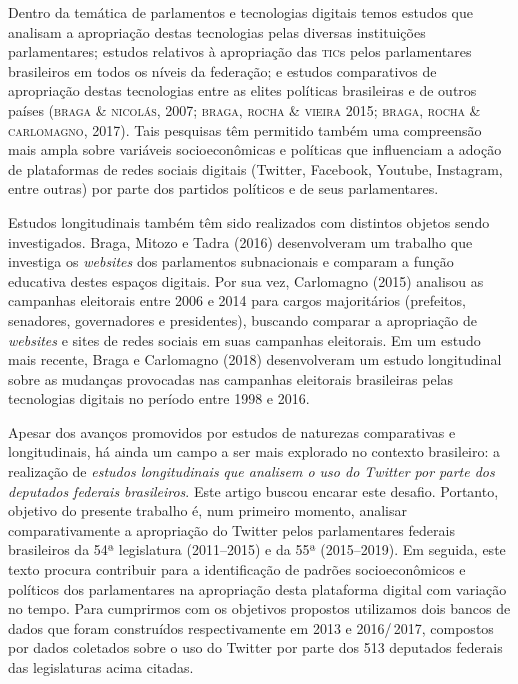 Dentro da temática de parlamentos e tecnologias digitais temos estudos
que analisam a apropriação destas tecnologias pelas diversas
instituições parlamentares; estudos relativos à apropriação das \textsc{tic}s
pelos parlamentares brasileiros em todos os níveis da federação; e
estudos comparativos de apropriação destas tecnologias entre as elites
políticas brasileiras e de outros países (\textsc{braga \& nicolás}, 2007; \textsc{braga,
rocha \& vieira} 2015; \textsc{braga, rocha \& carlomagno}, 2017). Tais pesquisas
têm permitido também uma compreensão mais ampla sobre variáveis
socioeconômicas e políticas que influenciam a adoção de plataformas de
redes sociais digitais (Twitter, Facebook, Youtube, Instagram, entre
outras) por parte dos partidos políticos e de seus parlamentares.

Estudos longitudinais também têm sido realizados com distintos objetos
sendo investigados. Braga, Mitozo e Tadra (2016) desenvolveram um
trabalho que investiga os \textit{websites} dos parlamentos subnacionais e
comparam a função educativa destes espaços digitais. Por sua vez,
Carlomagno (2015) analisou as campanhas eleitorais entre 2006 e 2014
para cargos majoritários (prefeitos, senadores, governadores e
presidentes), buscando comparar a apropriação de \textit{websites} e sites de
redes sociais em suas campanhas eleitorais. Em um estudo mais recente,
Braga e Carlomagno (2018) desenvolveram um estudo longitudinal sobre as
mudanças provocadas nas campanhas eleitorais brasileiras pelas
tecnologias digitais no período entre 1998 e 2016.

Apesar dos avanços promovidos por estudos de naturezas comparativas e
longitudinais, há ainda um campo a ser mais explorado no contexto
brasileiro: a realização de \textit{estudos longitudinais} \textit{que
analisem o uso do Twitter por parte dos deputados federais brasileiros}.
Este artigo buscou encarar este desafio. Portanto, objetivo do presente
trabalho é, num primeiro momento, analisar comparativamente a
apropriação do Twitter pelos parlamentares federais brasileiros da 54ª
legislatura (2011--2015) e da 55ª (2015--2019). Em seguida, este texto
procura contribuir para a identificação de padrões socioeconômicos e
políticos dos parlamentares na apropriação desta plataforma digital com
variação no tempo. Para cumprirmos com os objetivos propostos utilizamos
dois bancos de dados que foram construídos respectivamente em 2013 e
2016/\,2017, compostos por dados coletados sobre o uso do Twitter por
parte dos 513 deputados federais das legislaturas acima citadas.

